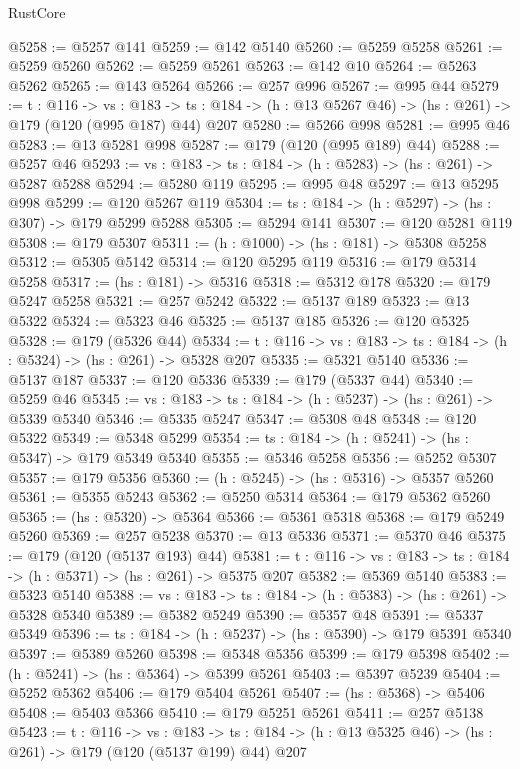 \begin{lexlean}{RustCore}
\begin{coremodule}
@5258 := @5257 @141
@5259 := @142 @5140
@5260 := @5259 @5258
@5261 := @5259 @5260
@5262 := @5259 @5261
@5263 := @142 @10
@5264 := @5263 @5262
@5265 := @143 @5264
@5266 := @257 @996
@5267 := @995 @44
@5279 := {t : @116} ->
  {vs : @183} ->
  {ts : @184} -> (h : @13 @5267 @46) -> (hs : @261) -> @179 (@120 (@995 @187) @44) @207
@5280 := @5266 @998
@5281 := @995 @46
@5283 := @13 @5281 @998
@5287 := @179 (@120 (@995 @189) @44)
@5288 := @5257 @46
@5293 := {vs : @183} -> {ts : @184} -> (h : @5283) -> (hs : @261) -> @5287 @5288
@5294 := @5280 @119
@5295 := @995 @48
@5297 := @13 @5295 @998
@5299 := @120 @5267 @119
@5304 := {ts : @184} -> (h : @5297) -> (hs : @307) -> @179 @5299 @5288
@5305 := @5294 @141
@5307 := @120 @5281 @119
@5308 := @179 @5307
@5311 := (h : @1000) -> (hs : @181) -> @5308 @5258
@5312 := @5305 @5142
@5314 := @120 @5295 @119
@5316 := @179 @5314 @5258
@5317 := (hs : @181) -> @5316
@5318 := @5312 @178
@5320 := @179 @5247 @5258
@5321 := @257 @5242
@5322 := @5137 @189
@5323 := @13 @5322
@5324 := @5323 @46
@5325 := @5137 @185
@5326 := @120 @5325
@5328 := @179 (@5326 @44)
@5334 := {t : @116} -> {vs : @183} -> {ts : @184} -> (h : @5324) -> (hs : @261) -> @5328 @207
@5335 := @5321 @5140
@5336 := @5137 @187
@5337 := @120 @5336
@5339 := @179 (@5337 @44)
@5340 := @5259 @46
@5345 := {vs : @183} -> {ts : @184} -> (h : @5237) -> (hs : @261) -> @5339 @5340
@5346 := @5335 @5247
@5347 := @5308 @48
@5348 := @120 @5322
@5349 := @5348 @5299
@5354 := {ts : @184} -> (h : @5241) -> (hs : @5347) -> @179 @5349 @5340
@5355 := @5346 @5258
@5356 := @5252 @5307
@5357 := @179 @5356
@5360 := (h : @5245) -> (hs : @5316) -> @5357 @5260
@5361 := @5355 @5243
@5362 := @5250 @5314
@5364 := @179 @5362 @5260
@5365 := (hs : @5320) -> @5364
@5366 := @5361 @5318
@5368 := @179 @5249 @5260
@5369 := @257 @5238
@5370 := @13 @5336
@5371 := @5370 @46
@5375 := @179 (@120 (@5137 @193) @44)
@5381 := {t : @116} -> {vs : @183} -> {ts : @184} -> (h : @5371) -> (hs : @261) -> @5375 @207
@5382 := @5369 @5140
@5383 := @5323 @5140
@5388 := {vs : @183} -> {ts : @184} -> (h : @5383) -> (hs : @261) -> @5328 @5340
@5389 := @5382 @5249
@5390 := @5357 @48
@5391 := @5337 @5349
@5396 := {ts : @184} -> (h : @5237) -> (hs : @5390) -> @179 @5391 @5340
@5397 := @5389 @5260
@5398 := @5348 @5356
@5399 := @179 @5398
@5402 := (h : @5241) -> (hs : @5364) -> @5399 @5261
@5403 := @5397 @5239
@5404 := @5252 @5362
@5406 := @179 @5404 @5261
@5407 := (hs : @5368) -> @5406
@5408 := @5403 @5366
@5410 := @179 @5251 @5261
@5411 := @257 @5138
@5423 := {t : @116} ->
  {vs : @183} ->
  {ts : @184} -> (h : @13 @5325 @46) -> (hs : @261) -> @179 (@120 (@5137 @199) @44) @207

\end{coremodule}
\end{lexlean}
